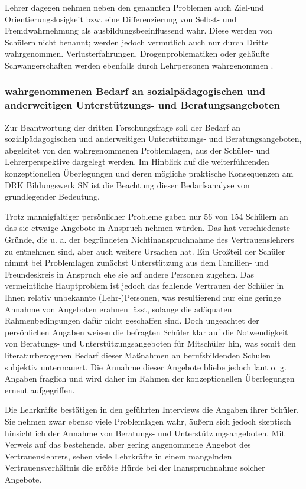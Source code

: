Lehrer dagegen nehmen neben den genannten Problemen auch Ziel-und Orientierungslosigkeit bzw. eine Differenzierung von Selbst- und Fremdwahrnehmung als ausbildungsbeeinflussend wahr. Diese werden von Schülern nicht benannt; werden jedoch vermutlich auch nur durch Dritte wahrgenommen. Verlusterfahrungen, Drogenproblematiken oder gehäufte Schwangerschaften werden ebenfalls durch Lehrpersonen wahrgenommen . \\

\subsubsection{wahrgenommenen Bedarf an sozialpädagogischen und anderweitigen Unterstützungs- und Beratungsangeboten}
\label{sec:wahrgenommenenBedarfAnSozialpädagogischenUndAnderweitigenUnterstützungsUndBeratungsangeboten}

Zur Beantwortung der dritten Forschungsfrage soll der Bedarf an sozialpädagogischen und anderweitigen Unterstützungs- und Beratungsangeboten, abgeleitet von den wahrgenommenen Problemlagen, aus der Schüler- und Lehrerperspektive dargelegt werden. Im Hinblick auf die weiterführenden konzeptionellen Überlegungen und deren mögliche praktische Konsequenzen am DRK Bildungswerk SN ist die Beachtung dieser Bedarfsanalyse von grundlegender Bedeutung. 

Trotz mannigfaltiger persönlicher Probleme gaben nur 56 von 154 Schülern an das sie etwaige Angebote in Anspruch nehmen würden. Das hat verschiedenste Gründe, die u. a. der begründeten Nichtinanspruchnahme des Vertrauenslehrers zu entnehmen sind, aber auch weitere Ursachen hat. Ein Großteil der Schüler nimmt bei Problemlagen zunächst Unterstützung aus dem Familien- und Freundeskreis in Anspruch ehe sie auf andere Personen zugehen. Das vermeintliche Hauptproblem ist jedoch das fehlende Vertrauen der Schüler in Ihnen relativ unbekannte (Lehr-)Personen, was resultierend nur eine geringe Annahme von Angeboten erahnen lässt, solange die adäquaten Rahmenbedingungen dafür nicht geschaffen sind. Doch ungeachtet der persönlichen Angaben weisen die befragten Schüler klar auf die Notwendigkeit von Beratungs- und Unterstützungsangeboten für Mitschüler hin, was somit den literaturbezogenen Bedarf dieser Maßnahmen an berufsbildenden Schulen subjektiv untermauert. Die Annahme dieser Angebote bliebe jedoch laut o. g. Angaben fraglich und wird daher im Rahmen der konzeptionellen Überlegungen erneut aufgegriffen.

Die Lehrkräfte bestätigen in den geführten Interviews die Angaben ihrer Schüler. Sie nehmen zwar ebenso viele Problemlagen wahr, äußern sich jedoch skeptisch hinsichtlich der Annahme von Beratungs- und Unterstützungsangeboten. Mit Verweis auf das bestehende, aber gering angenommene Angebot des Vertrauenslehrers, sehen viele Lehrkräfte in einem mangelnden Vertrauensverhältnis die größte Hürde bei der Inanspruchnahme solcher Angebote. 

